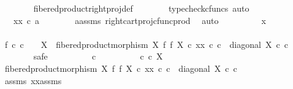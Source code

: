 \begin{isabellebody}
\ \ \ \ \ \ \isamarkupfalse%
\ fibered{\isacharunderscore}{\kern0pt}product{\isacharunderscore}{\kern0pt}right{\isacharunderscore}{\kern0pt}proj{\isacharunderscore}{\kern0pt}def\isanewline
\ \ \ \ \ \ \isamarkupfalse%
\ {\isacharparenleft}{\kern0pt}typecheck{\isacharunderscore}{\kern0pt}cfuncs{\isacharcomma}{\kern0pt}\ auto{\isacharparenright}{\kern0pt}\isanewline
\ \ \ \ \isamarkupfalse%
\ \isamarkupfalse%
\ {\isachardoublequoteopen}{\isachardot}{\kern0pt}{\isachardot}{\kern0pt}{\isachardot}{\kern0pt}\ {\isacharequal}{\kern0pt}\ xx\ {\isasymcirc}\isactrlsub c\ a{\isachardoublequoteclose}\isanewline
\ \ \ \ \ \ \isamarkupfalse%
\ a{\isacharunderscore}{\kern0pt}assms{\isacharparenleft}{\kern0pt}{}{\isacharparenright}{\kern0pt}\ right{\isacharunderscore}{\kern0pt}cart{\isacharunderscore}{\kern0pt}proj{\isacharunderscore}{\kern0pt}cfunc{\isacharunderscore}{\kern0pt}prod\ \isamarkupfalse%
\ auto\isanewline
\ \ \ \ \isamarkupfalse%
\ \isamarkupfalse%
\ {\isachardoublequoteopen}{\isachardot}{\kern0pt}{\isachardot}{\kern0pt}{\isachardot}{\kern0pt}\ {\isacharequal}{\kern0pt}\ x{\isachardoublequoteclose}\isanewline
\ \ \ \ \isamarkupfalse%
\ {\isacharminus}{\kern0pt}\isanewline
\ \ \ \ \ \ \isamarkupfalse%
\ f{}{\isacharcolon}{\kern0pt}\ {\isachardoublequoteopen}{\isasymforall}c{\isachardot}{\kern0pt}\ c\ {\isacharcolon}{\kern0pt}\ {\isasymone}\ {\isasymrightarrow}\ X\ {\isasymlongrightarrow}\ fibered{\isacharunderscore}{\kern0pt}product{\isacharunderscore}{\kern0pt}morphism\ X\ f\ f\ X\ {\isasymcirc}\isactrlsub c\ xx\ {\isasymcirc}\isactrlsub c\ c\ {\isacharequal}{\kern0pt}\ diagonal\ X\ {\isasymcirc}\isactrlsub c\ c{\isachardoublequoteclose}\isanewline
\ \ \ \ \ \ \isamarkupfalse%
\ safe\isanewline
\ \ \ \ \ \ \ \ \isamarkupfalse%
\ c\isanewline
\ \ \ \ \ \ \ \ \isamarkupfalse%
\ {\isachardoublequoteopen}c\ {\isasymin}\isactrlsub c\ X{\isachardoublequoteclose}\isanewline
\ \ \ \ \ \ \ \ \isamarkupfalse%
\ \isamarkupfalse%
\ {\isachardoublequoteopen}fibered{\isacharunderscore}{\kern0pt}product{\isacharunderscore}{\kern0pt}morphism\ X\ f\ f\ X\ {\isasymcirc}\isactrlsub c\ xx\ {\isasymcirc}\isactrlsub c\ c\ {\isacharequal}{\kern0pt}\ diagonal\ X\ {\isasymcirc}\isactrlsub c\ c{\isachardoublequoteclose}\isanewline
\ \ \ \ \ \ \ \ \ \ \isamarkupfalse%
\ assms\ xx{\isacharunderscore}{\kern0pt}assms\ \isamarkupfalse%

\end{isabellebody}
